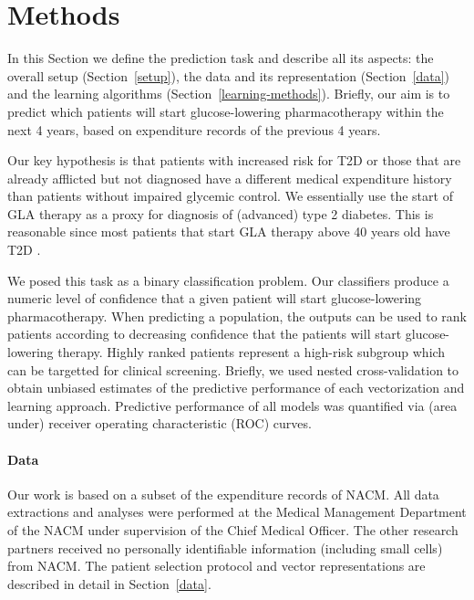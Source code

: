 \documentclass[twoside,11pt]{article}
\begin{document}
%
%

\section{Methods}
In this Section we define the prediction task and describe all its aspects: the overall setup (Section~\ref{setup}), the data and its representation (Section~\ref{data}) and the learning algorithms (Section~\ref{learning-methods}). Briefly, our aim is to predict which patients will start glucose-lowering pharmacotherapy within the next 4 years, based on expenditure records of the previous 4 years. 

Our key hypothesis is that patients with increased risk for T2D or those that are already afflicted but not diagnosed have a different medical expenditure history than patients without impaired glycemic control. We essentially use the start of GLA therapy as a proxy for diagnosis of (advanced) type 2 diabetes. This is reasonable since most patients that start GLA therapy above 40 years old have T2D \citep{world1994prevention}.

We posed this task as a binary classification problem. Our classifiers produce a numeric level of confidence that a given patient will start glucose-lowering pharmacotherapy. When predicting a population, the outputs can be used to rank patients according to decreasing confidence that the patients will start glucose-lowering therapy. Highly ranked patients represent a high-risk subgroup which can be targetted for clinical screening. Briefly, we used nested cross-validation to obtain unbiased estimates of the predictive performance of each vectorization and learning approach. Predictive performance of all models was quantified via (area under) receiver operating characteristic (ROC) curves. 

\paragraph{Data} Our work is based on a subset of the expenditure records of NACM. All data extractions and analyses were performed at the Medical Management Department of the NACM under supervision of the Chief Medical Officer. The other research partners received no personally identifiable information (including small cells) from NACM. The patient selection protocol and vector representations are described in detail in Section~\ref{data}.
\end{document}
